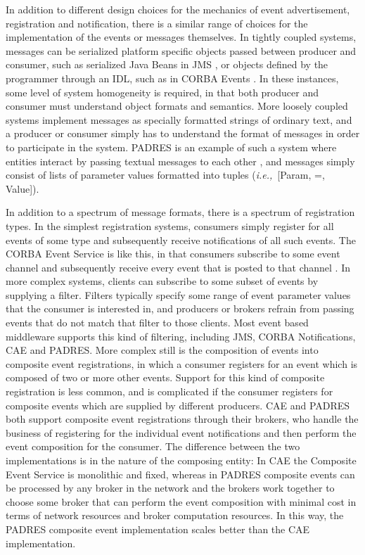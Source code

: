 \documentclass{acm_proc_article-sp}
\def\ie{{\it i.e.,\/}}
\begin{document}
In addition to different design choices for the mechanics of event advertisement, registration and notification, there is a similar range of choices for the implementation of the events or messages themselves. In tightly coupled systems, messages can be serialized platform specific objects passed between producer and consumer, such as serialized Java Beans in JMS \cite{Oracle:2002p8432}, or objects defined by the programmer through an IDL, such as in CORBA Events \cite{Siegel:1999p8569}. In these instances, some level of system homogeneity is required, in that both producer and consumer must understand object formats and semantics. More loosely coupled systems implement messages as specially formatted strings of ordinary text, and a producer or consumer simply has to understand the format of messages in order to participate in the system. PADRES is an example of such a system where entities interact by passing textual messages to each other \cite{Jacobsen:2010p8313}, and messages simply consist of lists of parameter values formatted into tuples (\ie\ [Param, =, Value]).

In addition to a spectrum of message formats, there is a spectrum of registration types. In the simplest registration systems, consumers simply register for all events of some type and subsequently receive notifications of all such events. The CORBA Event Service is like this, in that consumers subscribe to some event channel and subsequently receive every event that is posted to that channel . In more complex systems, clients can subscribe to some subset of events by supplying a filter. Filters typically specify some range of event parameter values that the consumer is interested in, and producers or brokers refrain from passing events that do not match that filter to those clients. Most event based middleware supports this kind of filtering, including JMS, CORBA Notifications, CAE and PADRES. More complex still is the composition of events into composite event registrations, in which a consumer registers for an event which is composed of two or more other events. Support for this kind of composite registration is less common, and is complicated if the consumer registers for composite events which are supplied by different producers. CAE and PADRES both support composite event registrations through their brokers, who handle the business of registering for the individual event notifications and then perform the event composition for the consumer. The difference between the two implementations is in the nature of the composing entity: In CAE the Composite Event Service is monolithic and fixed, whereas in PADRES composite events can be processed by any broker in the network and the brokers work together to choose some broker that can perform the event composition with minimal cost in terms of network resources and broker computation resources. In this way, the PADRES composite event implementation scales better than the CAE implementation.
\end{document}
